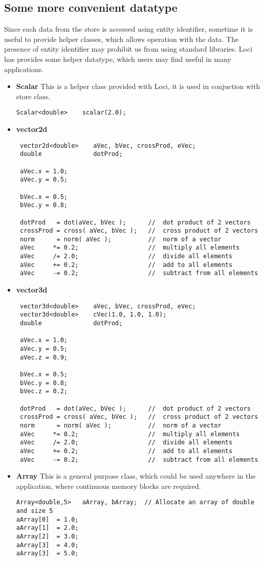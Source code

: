 \subsection { Some more convenient datatype }
\par Since each data from the store is accessed using entity identifier, sometime
it is useful to provide helper classes, which allows operation with the data. 
The presence of entity identifier may prohibit us from using standard libraries.
Loci has provides some helper datatype, which users may find useful in many
applications.
\begin{itemize}
\item {\bf Scalar} This is a helper class provided with Loci, it is used in conjuction
with store class.

\begin{verbatim}
Scalar<double>    scalar(2.0);
\end{verbatim}

\item {\bf vector2d}
\begin{verbatim}
 vector2d<double>    aVec, bVec, crossProd, eVec;
 double              dotProd;

 aVec.x = 1.0;
 aVec.y = 0.5;

 bVec.x = 0.5;
 bVec.y = 0.8;

 dotProd   = dot(aVec, bVec );      //  dot product of 2 vectors
 crossProd = cross( aVec, bVec );   //  cross product of 2 vectors
 norm      = norm( aVec );          //  norm of a vector
 aVec     *= 0.2;                   //  multiply all elements
 aVec     /= 2.0;                   //  divide all elements
 aVec     += 0.2;                   //  add to all elements
 aVec     -= 0.2;                   //  subtract from all elements
\end{verbatim}

\item {\bf vector3d}
\begin{verbatim}
 vector3d<double>    aVec, bVec, crossProd, eVec;
 vector3d<double>    cVec(1.0, 1.0, 1.0);
 double              dotProd;

 aVec.x = 1.0;
 aVec.y = 0.5;
 aVec.z = 0.9;

 bVec.x = 0.5;
 bVec.y = 0.8;
 bVec.z = 0.2;

 dotProd   = dot(aVec, bVec );      //  dot product of 2 vectors
 crossProd = cross( aVec, bVec );   //  cross product of 2 vectors
 norm      = norm( aVec );          //  norm of a vector
 aVec     *= 0.2;                   //  multiply all elements
 aVec     /= 2.0;                   //  divide all elements
 aVec     += 0.2;                   //  add to all elements
 aVec     -= 0.2;                   //  subtract from all elements
\end{verbatim}
%
\item {\bf Array} This is a general purpose class, which could be used anywhere in
the application, where continuous memory blocks are required.
%
\begin{verbatim}
Array<double,5>   aArray, bArray;  // Allocate an array of double and size 5
aArray[0]  = 1.0;             
aArray[1]  = 2.0;
aArray[2]  = 3.0;
aArray[3]  = 4.0;
aArray[3]  = 5.0;


\end{verbatim}
\end{itemize}
